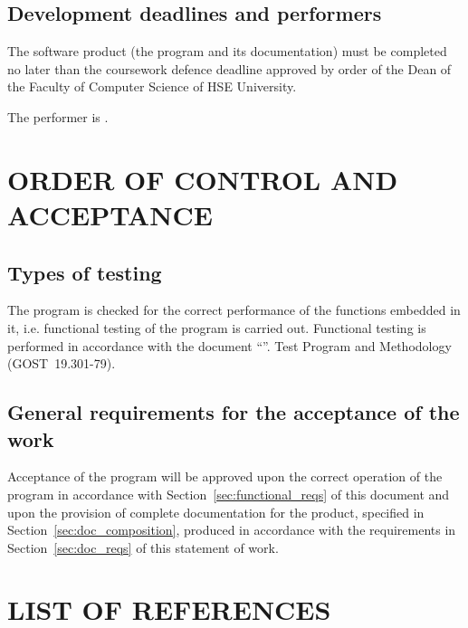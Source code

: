 \documentclass[12pt,a4paper]{extarticle}
\begin{document}
\subsection{Development deadlines and performers}

The software product (the program and its documentation) must be completed no later than the coursework defence deadline approved by order of the Dean of the Faculty of Computer Science of HSE University.

The performer is \hseAuthorName.

\clearpage

\section{ORDER OF CONTROL AND ACCEPTANCE}

\subsection{Types of testing}

The program is checked for the correct performance of the functions embedded in it, i.e. functional testing of the program is carried out. Functional testing is performed in accordance with the document \enquote{\projectname}. Test Program and Methodology (GOST~19.301-79).

\subsection{General requirements for the acceptance of the work}

Acceptance of the program will be approved upon the correct operation of the program in accordance with Section~\ref{sec:functional_reqs} of this document and upon the provision of complete documentation for the product, specified in Section~\ref{sec:doc_composition}, produced in accordance with the requirements in Section~\ref{sec:doc_reqs} of this statement of work.

\clearpage
\pagestyle{appendix}

\section*{LIST OF REFERENCES}
\end{document}
